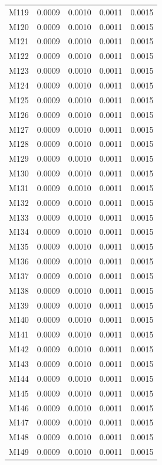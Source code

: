 \begin{longtable}{lrrrr}
M119 & 0.0009 & 0.0010 & 0.0011 & 0.0015 \\
M120 & 0.0009 & 0.0010 & 0.0011 & 0.0015 \\
M121 & 0.0009 & 0.0010 & 0.0011 & 0.0015 \\
M122 & 0.0009 & 0.0010 & 0.0011 & 0.0015 \\
M123 & 0.0009 & 0.0010 & 0.0011 & 0.0015 \\
M124 & 0.0009 & 0.0010 & 0.0011 & 0.0015 \\
M125 & 0.0009 & 0.0010 & 0.0011 & 0.0015 \\
M126 & 0.0009 & 0.0010 & 0.0011 & 0.0015 \\
M127 & 0.0009 & 0.0010 & 0.0011 & 0.0015 \\
M128 & 0.0009 & 0.0010 & 0.0011 & 0.0015 \\
M129 & 0.0009 & 0.0010 & 0.0011 & 0.0015 \\
M130 & 0.0009 & 0.0010 & 0.0011 & 0.0015 \\
M131 & 0.0009 & 0.0010 & 0.0011 & 0.0015 \\
M132 & 0.0009 & 0.0010 & 0.0011 & 0.0015 \\
M133 & 0.0009 & 0.0010 & 0.0011 & 0.0015 \\
M134 & 0.0009 & 0.0010 & 0.0011 & 0.0015 \\
M135 & 0.0009 & 0.0010 & 0.0011 & 0.0015 \\
M136 & 0.0009 & 0.0010 & 0.0011 & 0.0015 \\
M137 & 0.0009 & 0.0010 & 0.0011 & 0.0015 \\
M138 & 0.0009 & 0.0010 & 0.0011 & 0.0015 \\
M139 & 0.0009 & 0.0010 & 0.0011 & 0.0015 \\
M140 & 0.0009 & 0.0010 & 0.0011 & 0.0015 \\
M141 & 0.0009 & 0.0010 & 0.0011 & 0.0015 \\
M142 & 0.0009 & 0.0010 & 0.0011 & 0.0015 \\
M143 & 0.0009 & 0.0010 & 0.0011 & 0.0015 \\
M144 & 0.0009 & 0.0010 & 0.0011 & 0.0015 \\
M145 & 0.0009 & 0.0010 & 0.0011 & 0.0015 \\
M146 & 0.0009 & 0.0010 & 0.0011 & 0.0015 \\
M147 & 0.0009 & 0.0010 & 0.0011 & 0.0015 \\
M148 & 0.0009 & 0.0010 & 0.0011 & 0.0015 \\
M149 & 0.0009 & 0.0010 & 0.0011 & 0.0015 \\

\end{longtable}
